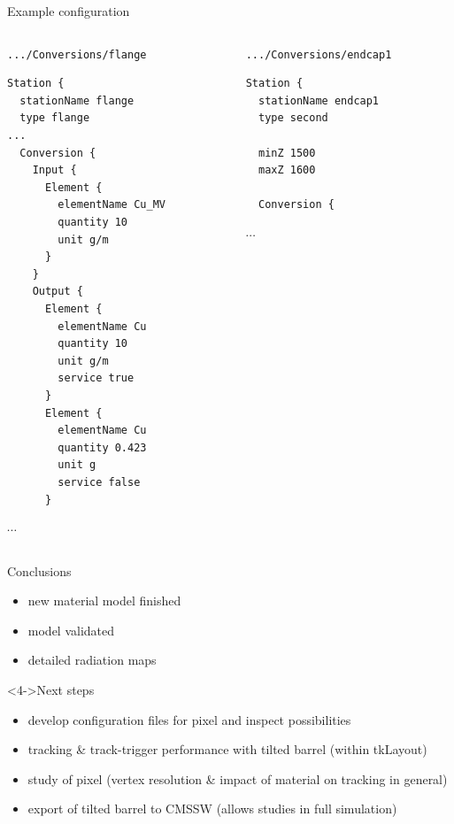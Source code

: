 \documentclass[pdftex, 11pt]{beamer}
\newcommand{\pat}[1]{\texttt{#1}}
\begin{document}
\begin{frame}[fragile]{Example configuration}
  \tiny
  \begin{columns}[t]
    \begin{column}{0.47\textwidth}
      \begin{block}{\pat{.../Conversions/flange}}
\begin{verbatim}
Station {
  stationName flange
  type flange
...
  Conversion {
    Input {
      Element {
        elementName Cu_MV
        quantity 10
        unit g/m
      }
    }
    Output {
      Element {
        elementName Cu
        quantity 10
        unit g/m
        service true
      }
      Element {
        elementName Cu
        quantity 0.423
        unit g
        service false
      }
\end{verbatim}
$\cdots$
      \end{block}
    \end{column}
    \begin{column}{0.47\textwidth}
      \begin{block}{\pat{.../Conversions/endcap1}}
\begin{verbatim}
Station {
  stationName endcap1
  type second

  minZ 1500
  maxZ 1600

  Conversion {
\end{verbatim}
$\cdots$
      \end{block}
    \end{column}
  \end{columns}
\end{frame}

\begin{frame}
  \begin{block}{Conclusions}
    \begin{itemize}
    \item new material model \alert{finished}
    \item<2-> model validated
    \item<3-> detailed \alert{radiation maps}
    \end{itemize}    
  \end{block}
  \begin{block}<4->{Next steps}
    \begin{itemize}
    \item<4-> develop configuration files for \alert{pixel} and
      \alert{inspect} possibilities
    \item<5-> tracking \& track-trigger performance with \alert{tilted} barrel (within tkLayout) 
    \item<6-> study of \alert{pixel} (vertex resolution \& impact of material on tracking in general)
    \item<7-> \alert{export} of tilted barrel to CMSSW (allows studies in full simulation)
    \end{itemize}
  \end{block}
\end{frame}
\end{document}
